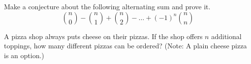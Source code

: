 \documentclass[nooutcomes,noauthor]{ximera}
\begin{document}
\begin{problem}
Make a conjecture about the following alternating sum and prove it.  
\[
\binom{n}{0} - \binom{n}{1} + \binom{n}{2} - \dots +  (-1)^n\binom{n}{n} 
\]
\end{problem}

\begin{problem}
A pizza shop always puts cheese on their pizzas.  If the shop offers
$n$ additional toppings, how many different pizzas can be ordered?  
(Note: A plain cheese pizza is an option.)
\end{problem}
\end{document}
